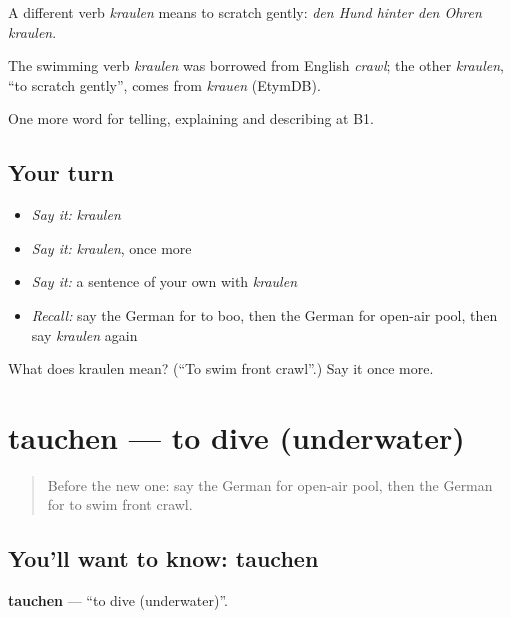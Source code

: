 A different verb \emph{kraulen} means to scratch gently: \emph{den Hund hinter den Ohren kraulen}.

\begin{cousinweb}
The swimming verb \emph{kraulen} was borrowed from English \emph{crawl}; the other \emph{kraulen}, \textquotedblleft{}to scratch gently\textquotedblright{}, comes from \emph{krauen} (EtymDB).
\end{cousinweb}

\begin{grammarlens}[title={What you've built}]
One more word for telling, explaining and describing at B1.
\end{grammarlens}

\subsection*{Your turn}
\begin{itemize}
\raggedright
  \item \emph{Say it:} \emph{kraulen}
  \item \emph{Say it:} \emph{kraulen}, once more
  \item \emph{Say it:} a sentence of your own with \emph{kraulen}
  \item \emph{Recall:} say the German for to boo, then the German for open-air pool, then say \emph{kraulen} again
\end{itemize}

\begin{tcolorbox}[breakable,colback=teal!4,colframe=teal!35!black,title={Before you move on}]
What does kraulen mean? (\textquotedblleft{}To swim front crawl\textquotedblright{}.) Say it once more.
\end{tcolorbox}
\section[tauchen]{tauchen — to dive (underwater)}

\label{lesson:GE-C511-tauchen}



\begin{quote}
Before the new one: say the German for open-air pool, then the German for to swim front crawl.
\end{quote}

\subsection*{You'll want to know: tauchen}
\textbf{tauchen} — \textquotedblleft{}to dive (underwater)\textquotedblright{}.

